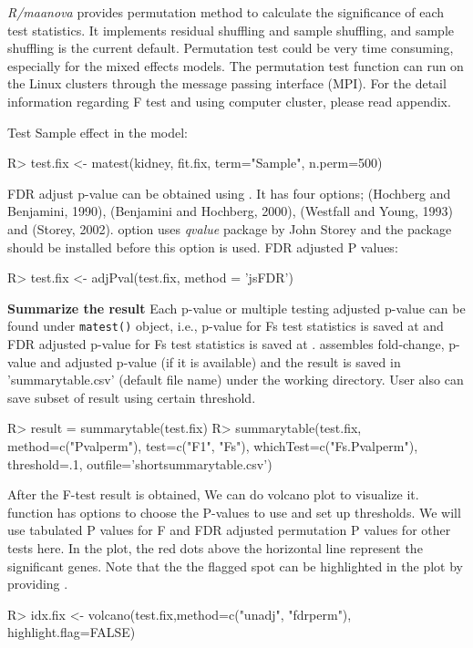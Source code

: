 {\em R/maanova} provides permutation method to calculate the significance of
each test statistics. It implements residual shuffling and sample shuffling,
and sample shuffling is the current default. Permutation test could be very
time consuming, especially for the mixed effects models. The permutation
test function can run on the Linux clusters through the message passing 
interface (MPI). For the detail information regarding F test and 
using computer cluster, please read appendix. 

Test Sample effect in the model:
\begin{Sinput}
R> test.fix <- matest(kidney, fit.fix, term="Sample", n.perm=500)
\end{Sinput}

FDR adjust p-value can be obtained using . It has four
  options;   (Hochberg and Benjamini, 1990),  (Benjamini and Hochberg, 2000), 
  (Westfall and Young, 1993) and  (Storey,
  2002).  option uses {\em qvalue} package by John
  Storey and the package should be installed before this option
  is used. FDR adjusted P values:
\begin{Sinput}
R> test.fix <- adjPval(test.fix, method = 'jsFDR')
\end{Sinput}
{\bf Summarize the result} Each p-value or multiple testing adjusted p-value
can be found under {\tt matest()} object, i.e., p-value for Fs test statistics is
saved at  and FDR adjusted p-value for Fs
test statistics is saved at .  assembles
fold-change, p-value and adjusted p-value (if it is available) and the result
is saved in 'summarytable.csv' (default file name) under the working directory. User also can save subset of result using certain threshold.  
\begin{Sinput}
R> result = summarytable(test.fix)
R> summarytable(test.fix, method=c("Pvalperm"), test=c("F1", "Fs"),
whichTest=c("Fs.Pvalperm"), threshold=.1, outfile='shortsummarytable.csv')
\end{Sinput}

After the F-test result is obtained, We can do volcano plot
to visualize it.  function has options to 
choose the P-values to use and set up thresholds. We will
use tabulated P values for F and FDR adjusted permutation 
P values for other tests here. 
In the plot, the red dots above the horizontal line represent
the significant genes. 
Note that the the flagged spot can be highlighted in the plot by providing .
\begin{Sinput}
R> idx.fix <- volcano(test.fix,method=c("unadj", "fdrperm"),
         highlight.flag=FALSE)
\end{Sinput}

